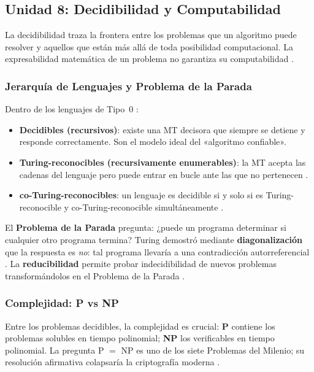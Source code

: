 \newpage
\subsection*{Unidad 8: Decidibilidad y Computabilidad}

La decidibilidad traza la frontera entre los problemas que un algoritmo puede resolver y aquellos
que están más allá de toda posibilidad computacional. La expresabilidad matemática de un problema
no garantiza su computabilidad \cite{sipser2012}.

\subsubsection*{Jerarquía de Lenguajes y Problema de la Parada}

Dentro de los lenguajes de Tipo~0 \cite{hopcroft2007es}:
\begin{itemize}
  \item \textbf{Decidibles (recursivos)}: existe una MT decisora que siempre se detiene y
        responde correctamente. Son el modelo ideal del «algoritmo confiable».
  \item \textbf{Turing-reconocibles (recursivamente enumerables)}: la MT acepta las cadenas del
        lenguaje pero puede entrar en bucle ante las que no pertenecen \cite{cooper2003}.
  \item \textbf{co-Turing-reconocibles}: un lenguaje es decidible si y solo si es Turing-reconocible
        y co-Turing-reconocible simultáneamente \cite{kelley2001}.
\end{itemize}

El \textbf{Problema de la Parada} pregunta: ¿puede un programa determinar si cualquier otro
programa termina? Turing demostró mediante \textbf{diagonalización} que la respuesta es
\emph{no}: tal programa llevaría a una contradicción autorreferencial \cite{sipser2012}. La
\textbf{reducibilidad} permite probar indecidibilidad de nuevos problemas transformándolos en
el Problema de la Parada \cite{decastro2004}.

\subsubsection*{Complejidad: P vs NP}

Entre los problemas decidibles, la complejidad es crucial: \textbf{P} contiene los problemas
solubles en tiempo polinomial; \textbf{NP} los verificables en tiempo polinomial. La pregunta
P $=$ NP es uno de los siete Problemas del Milenio; su resolución afirmativa colapsaría la
criptografía moderna \cite{eugene2008}.

